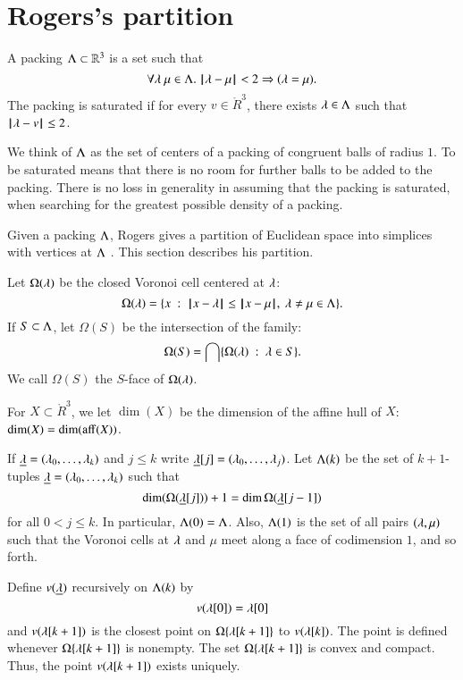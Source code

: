\section{Rogers's partition}

\begin{definition}
A packing $\Lambda\subset \mathbb{R}^3$ is a set such that
$$\forall \lambda~\mu\in \Lambda.~  {\hskip0.1em|\hskip-0.15em|\hskip0.1em}\lambda - \mu{\hskip0.1em|\hskip-0.15em|\hskip0.1em} < 2 \Rightarrow (\lambda=\mu).$$
The packing is saturated if for every $v\in\ring{R}^3$,   there exists $\lambda\in\Lambda$
such that ${\hskip0.1em|\hskip-0.15em|\hskip0.1em}\lambda - v{\hskip0.1em|\hskip-0.15em|\hskip0.1em}\le 2$.
\end{definition}

We think of $\Lambda$ as the set of centers of a  packing of congruent balls of radius $1$.
To be saturated means that there is no room for further balls to be added to the packing.
There is no loss in generality in assuming that the packing is saturated, when searching
for the greatest possible density of a packing.

Given a packing $\Lambda$, Rogers gives a partition of Euclidean space into
simplices with vertices at $\Lambda$ \cite{Rogers:1958:Packing}.   This section describes his partition.

Let $\Omega(\lambda)$  be the closed Voronoi cell centered at $\lambda$:
$$
  \Omega(\lambda) = \{x \ :\   {\hskip0.1em|\hskip-0.15em|\hskip0.1em}x - \lambda{\hskip0.1em|\hskip-0.15em|\hskip0.1em} 
\le {\hskip0.1em|\hskip-0.15em|\hskip0.1em}x - \mu{\hskip0.1em|\hskip-0.15em|\hskip0.1em},\ \lambda\ne\mu\in\Lambda\}.
$$
If $S\subset\Lambda$, let $\Omega(S)$ be the intersection of the family:
$$\Omega(S)  = \bigcap \{\Omega(\lambda)\ :\  \lambda\in S \}.$$
We call $\Omega(S)$ the $S$-face of $\Omega(\lambda)$.

For $X\subset\ring{R}^3$, we let $\dim(X)$ be the dimension of the affine hull
of $X$: $\dim(X) = \dim({\operatorname{aff}}(X))$.

If ${\underline{\lambda}}=(\lambda_0,\ldots,\lambda_k)$ and $j\le k$ write ${\underline{\lambda}}[j] = (\lambda_0,\ldots,\lambda_j)$.
Let $\Lambda(k)$ be the set of $k+1$-tuples ${\underline{\lambda}}=(\lambda_0,\ldots,\lambda_k)$ such
that 
\begin{equation}\label{eqn:omega-dim}
\dim(\Omega({\underline{\lambda}}[j]))+1 = \dim\Omega({\underline{\lambda}}[j-1])
\end{equation}
for all $0<j\le k$.
In particular, $\Lambda(0)=\Lambda$.  Also, $\Lambda(1)$ is the
set of all pairs $(\lambda,\mu)$ such that the Voronoi cells at $\lambda$ and $\mu$ meet along
a face of codimension $1$, and
so forth.


Define $v({\underline{\lambda}})$ recursively on $\Lambda(k)$ by
$$v(\lambda[0]) = \lambda[0]$$
and $v(\lambda[k+1])$ is the closest point on $\Omega\{\lambda[k+1]\}$ to $v(\lambda[k])$.  The point is defined whenever $\Omega\{\lambda[k+1]\}$ is nonempty.
The set $\Omega\{\lambda[k+1]\}$ is convex and compact.  Thus, the point $v(\lambda[k+1])$ exists
uniquely.

